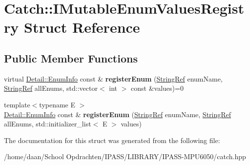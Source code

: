 \hypertarget{structCatch_1_1IMutableEnumValuesRegistry}{}\section{Catch\+:\+:I\+Mutable\+Enum\+Values\+Registry Struct Reference}
\label{structCatch_1_1IMutableEnumValuesRegistry}
\subsection*{Public Member Functions}
\begin{DoxyCompactItemize}
\item 
\mbox{\label{structCatch_1_1IMutableEnumValuesRegistry_a948e66e85f5b66ab68256d50bfe548f4}} 
virtual \hyperlink{structCatch_1_1Detail_1_1EnumInfo}{Detail\+::\+Enum\+Info} const  \& {\bfseries register\+Enum} (\hyperlink{classCatch_1_1StringRef}{String\+Ref} enum\+Name, \hyperlink{classCatch_1_1StringRef}{String\+Ref} all\+Enums, std\+::vector$<$ int $>$ const \&values)=0
\item 
\mbox{\label{structCatch_1_1IMutableEnumValuesRegistry_a60e4546c6fd45f9be68e43410403b562}} 
{\footnotesize template$<$typename E $>$ }\\\hyperlink{structCatch_1_1Detail_1_1EnumInfo}{Detail\+::\+Enum\+Info} const  \& {\bfseries register\+Enum} (\hyperlink{classCatch_1_1StringRef}{String\+Ref} enum\+Name, \hyperlink{classCatch_1_1StringRef}{String\+Ref} all\+Enums, std\+::initializer\+\_\+list$<$ E $>$ values)
\end{DoxyCompactItemize}


The documentation for this struct was generated from the following file\+:\begin{DoxyCompactItemize}
\item 
/home/daan/\+School Opdrachten/\+I\+P\+A\+S\+S/\+L\+I\+B\+R\+A\+R\+Y/\+I\+P\+A\+S\+S-\/\+M\+P\+U6050/catch.\+hpp\end{DoxyCompactItemize}
